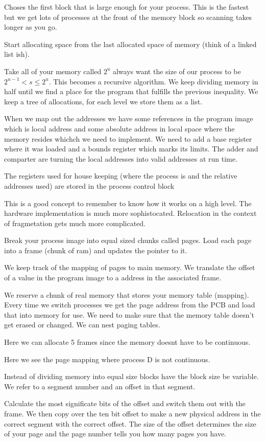 \documentclass{article}
\begin{document}
Choses the first block that is large enough for your process. This is the fastest but we get lots of processes at the front of the memory block so scanning takes longer as you go.

Start allocating space from the last allocated space of memory (think of a linked list ish).


Take all of your memory called $2^u$ always want the size of our process to be $2^{u-1} < s \leq 2^u$. This becomes a recursive algorithm. We keep dividing memory in half until we find a place for the program that fulfills the previous inequality. We keep a tree of allocations, for each level we store them as a list.





When we map out the addresses we have some references in the program image which is local address and some absolute address in local space where the memory resides whichch we need to implement. We need to add a base register where it was loaded and a bounds register which marks its limits. The adder and comparter are turning the local addresses into valid addresses at run time.

The registers used for house keeping (where the process is and the relative addresses used) are stored in the process control block

This is a good concept to remember to know how it works on a high level. The hardware implementation is much more sophistocated. Relocation in the context of fragmetation gets much more complicated.


Break your process image into equal sized chunks called pages. Load each page into a frame (chunk of ram) and updates the pointer to it.

We keep track of the mapping of pages to main memory. We translate the offset of a value in the program image to a address in the associated frame.

We reserve a chunk of real memory that stores your memory table (mapping). Every time we switch processes we get the page address from the PCB and load that into memory for use. We need to make sure that the memory table doesn't get erased or changed. We can nest paging tables.


Here we can allocate 5 frames since the memory doesnt have to be continuous.

Here we see the page mapping where process D is not continuous.

Instead of dividing memory into equal size blocks have the block size be variable. We refer to a segment number and an offset in that segment.


Calculate the most significate bits of the offset and switch them out with the frame. We then copy over the ten bit offset to make a new physical address in the correct segment with the correct offset. The size of the offset determines the size of your page and the page number tells you how many pages you have.



\end{document}
